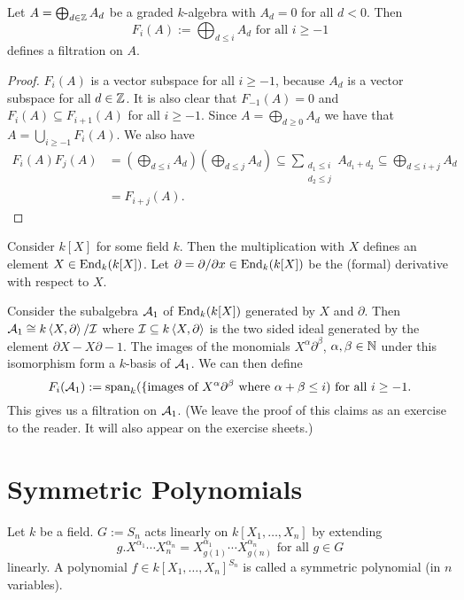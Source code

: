 \begin{lem}
 Let $A = \bigoplus_{d \in \mathbb{Z}} A_d$ be a graded $k$-algebra with $A_d = 0$ for all $d < 0$. Then
 \[
  F_i(A) := \bigoplus_{d \leq i} A_d \text{ for all } i \geq -1
 \]
 defines a filtration on $A$.
\end{lem}
\begin{proof}
 $F_i(A)$ is a vector subspace for all $i \geq -1$, because $A_d$ is a vector subspace for all $d \in \mathbb{Z}$. It is also clear that $F_{-1}(A) = 0$ and $F_i(A) \subseteq F_{i+1}(A)$ for all $i \geq -1$. Since $A = \bigoplus_{d \geq 0} A_d$ we have that $A = \bigcup_{i \geq -1} F_i(A)$. We also have
 \begin{align*}
  F_i(A) F_j(A)
  &= \left( \bigoplus_{d \leq i} A_d \right) \left( \bigoplus_{d \leq j} A_d \right)
  \subseteq \sum_{\substack{d_1 \leq i \\ d_2 \leq j}} A_{d_1 + d_2}
  \subseteq \bigoplus_{d \leq i+j} A_d \\
  &= F_{i+j}(A).
 \end{align*}
\end{proof}


\begin{expl}
 Consider $k[X]$ for some field $k$. Then the multiplication with $X$ defines an element $X \in \operatorname{End}_k(k[X])$. Let $\partial = \partial/\partial x \in \operatorname{End}_k(k[X])$ be the (formal) derivative with respect to $X$.
 
 Consider the subalgebra $\mathcal{A}_1$ of $\operatorname{End}_k(k[X])$ generated by $X$ and $\partial$. Then $\mathcal{A}_1 \cong k\left\langle X,\partial \right\rangle/\mathcal{I}$ where $\mathcal{I} \subseteq k \left\langle X,\partial \right\rangle$ is the two sided ideal generated by the element $\partial X - X \partial - 1$. The images of the monomials $X^\alpha \partial^\beta$, $\alpha, \beta \in \mathbb{N}$ under this isomorphism form a $k$-basis of $\mathcal{A}_1$. We can then define
 \[
  F_i(\mathcal{A}_1) := \operatorname{span}_k(\{\text{images of $X^\alpha \partial^\beta$ where $\alpha+\beta \leq i$}) \text{ for all } i \geq -1.
 \]
 This gives us a filtration on $\mathcal{A}_1$. (We leave the proof of this claims as an exercise to the reader. It will also appear on the exercise sheets.)
\end{expl}





\section{Symmetric Polynomials}


\begin{defi}
 Let $k$ be a field. $G := S_n$ acts linearly on $k[X_1, \dotsc, X_n]$ by extending
 \[
  g.X^{\alpha_1} \dotsm X_n^{\alpha_n} = X_{g(1)}^{\alpha_1} \dotsm X_{g(n)}^{\alpha_n} \text{ for all } g \in G
 \]
 linearly. A polynomial $f \in k[X_1, \dotsc, X_n]^{S_n}$ is called a symmetric polynomial (in $n$ variables).
\end{defi}


